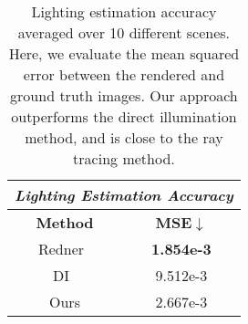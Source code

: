 \begin{table}
	\begin{center}
		\begin{tabular}{|c|c|}
			\hline
			\multicolumn{2}{|c|}{\textit{Lighting Estimation Accuracy}} \\
			\hline
			\textbf{Method}                                           & \textbf{MSE}$\downarrow$ 	   \\
			\hline
			Redner~\cite{li2018differentiable}						  & \textbf{1.854e-3}	           \\
			DI~\cite{ravi2020pytorch3d} 						      & 9.512e-3              		   \\
			\hline
			Ours    									   	     	  & 2.667e-3                  	   \\
			\hline
		\end{tabular}
	\end{center}
	\caption
	{
		Lighting estimation accuracy averaged over 10 different scenes.
		Here, we evaluate the mean squared error between the rendered  and  ground truth  images.
		Our approach outperforms the direct illumination method, and is close to the ray tracing method. 
	}
	\label{tab:lighting}
\end{table}
%
%
%
